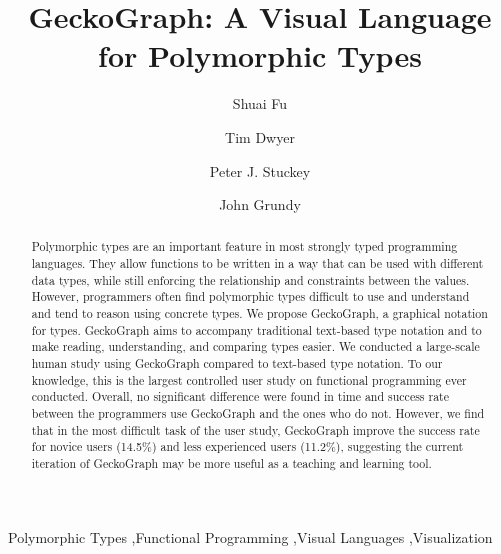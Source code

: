 \documentclass[preprint,12pt]{elsarticle}
\begin{document}
\begin{frontmatter}

 \author{Shuai Fu}

 \author{Tim Dwyer}

 \author{Peter J. Stuckey}

 \author{John Grundy}




\title{GeckoGraph: A Visual Language for Polymorphic Types}

\begin{abstract}
Polymorphic types are an important feature in most strongly typed programming languages. They allow functions to be written in a way that can be used with different data types, while still enforcing the relationship and constraints between the values. However, programmers often find polymorphic types difficult to use and understand and tend to reason using concrete types. We propose GeckoGraph, a graphical notation for types. GeckoGraph aims to accompany traditional text-based type notation and to make reading, understanding, and comparing types easier. We conducted a large-scale human study using GeckoGraph compared to text-based type notation. To our knowledge, this is the largest controlled user study on functional programming ever conducted. Overall, no significant difference were found  in time and success rate between the programmers use GeckoGraph and the ones who do not. However, we find that in the most difficult task of the user study, GeckoGraph improve the success rate for novice users (14.5\%) and less experienced users (11.2\%), suggesting the current iteration of GeckoGraph may be more useful as a teaching and learning tool. 
\end{abstract}

\begin{keyword}


Polymorphic Types \sep Functional Programming \sep Visual Languages \sep Visualization
\end{keyword}

\end{frontmatter}

\linenumbers
\end{document}
